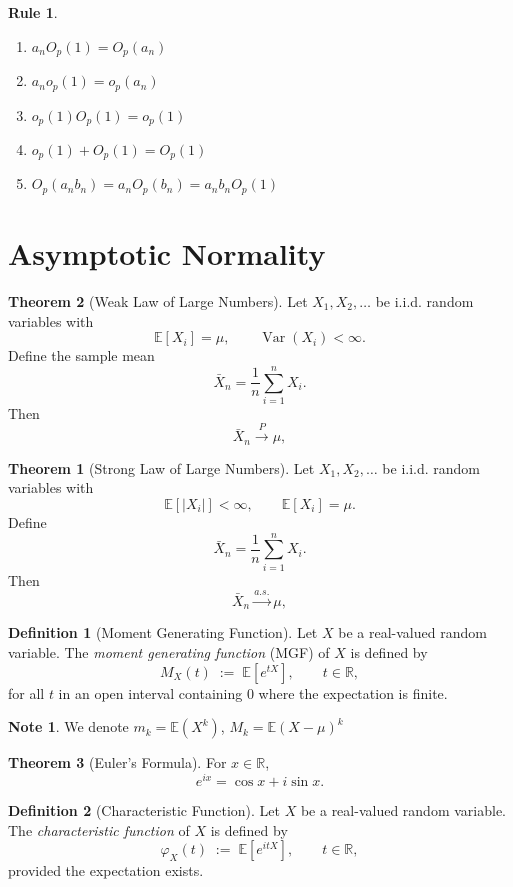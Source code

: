 \documentclass[11pt]{article}
\theoremstyle{definition}
\newtheorem{defn}{Definition}[section]
\newtheorem{reg}{Rule}[section]
\newtheorem{note}{Note}[section]
\newtheorem{theo}{Theorem}[section]
\begin{document}
\begin{reg}
    \begin{enumerate}
        \item $a_nO_p(1) = O_p(a_n)$
        \item $a_no_p(1) = o_p(a_n)$
        \item $o_p(1)O_p(1) = o_p(1)$
        \item $o_p(1)+O_p(1) = O_p(1)$
        \item $O_p(a_nb_n) = a_nO_p(b_n) = a_nb_nO_p(1)$
    \end{enumerate}
\end{reg}
\newpage
\section{Asymptotic Normality}
\begin{theo}[Weak Law of Large Numbers]
    Let \(X_1, X_2, \dots\) be i.i.d. random variables with
\[
\mathbb{E}[X_i]=\mu,
\qquad
\operatorname{Var}(X_i)<\infty.
\]
Define the sample mean
\[
\bar X_n=\frac1n\sum_{i=1}^n X_i.
\]
Then
\[
\bar X_n \xrightarrow{P} \mu,
\]

\begin{theo}[Strong Law of Large Numbers]
    Let \(X_1, X_2, \dots\) be i.i.d. random variables with
\[
\mathbb{E}[|X_i|]<\infty,
\qquad
\mathbb{E}[X_i]=\mu.
\]
Define
\[
\bar X_n=\frac1n\sum_{i=1}^n X_i.
\]
Then
\[
\bar X_n \xrightarrow{a.s.} \mu,
\]
\end{theo}
\end{theo}
\begin{defn}[Moment Generating Function]
Let $X$ be a real-valued random variable. The \emph{moment generating function} (MGF) of $X$ is defined by
\[
M_X(t) \;:=\; \mathbb{E}\!\left[e^{tX}\right], \qquad t \in \mathbb{R},
\]
for all $t$ in an open interval containing $0$ where the expectation is finite.
\end{defn}
\begin{note}
    We denote $m_k = \mathbb{E}(X^k)$, $M_k = \mathbb{E}(X-\mu)^k$
\end{note}
\begin{theo}[Euler's Formula]
For $x \in \mathbb{R}$,
    \[
    e^{ix} = \cos x + i \sin x.
    \]
\end{theo}
\begin{defn}[Characteristic Function]
Let $X$ be a real-valued random variable. The \emph{characteristic function} of $X$ is defined by
\[
\varphi_X(t) \;:=\; \mathbb{E}\!\left[e^{itX}\right], \qquad t \in \mathbb{R},
\]
provided the expectation exists.
\end{defn}
\end{document}
